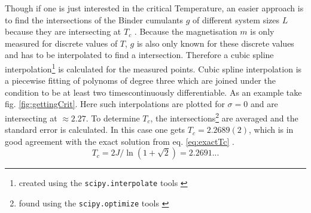     Though if one is just interested in the critical Temperature, an
    easier approach is to find the intersections of the Binder cumulants
    \(g\) of different system sizes \(L\) because they are intersecting
    at \(T_c\) \cite{Binder1981}.
    Because  the magnetisation \(m\) is only measured for discrete values
    of \(T\), \(g\) is also only known for these discrete values and has
    to be interpolated to find a intersection. Therefore a cubic spline
    interpolation\footnote{created using the \texttt{scipy.interpolate} tools \cite{scipy2001}}
    is calculated for the measured points.
    Cubic spline interpolation is a piecewise fitting of polynoms of
    degree three which are joined under the condition to be at least two
    timescontinuously differentiable.
    As an example take fig. \ref{fig:gettingCrit}.
    Here such interpolations are plotted for \(\sigma=0\) and are
    intersecting at \(\approx 2.27\).
    To determine \(T_c\), the intersections\footnote{found using the \texttt{scipy.optimize} tools \cite{scipy2001}}
    are averaged and the standard error is calculated. In this case one
    gets \(T_c = 2.2689(2)\), which is in good agreement with the
    exact solution from eq. \eqref{eq:exactTc} \cite{Onsager1944}.
    \begin{equation}
        T_c = 2J/\ln(1+\sqrt 2) = 2.2691...
        \label{eq:exactTc}
    \end{equation}

